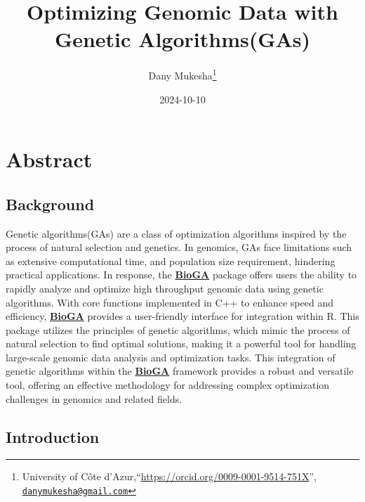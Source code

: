 \documentclass[
]{article}
\title{Optimizing Genomic Data with Genetic Algorithms(GAs)}
\author{Dany Mukesha\footnote{University of Côte
  d'Azur,``\url{https://orcid.org/0009-0001-9514-751X}'',
  \href{mailto:danymukesha@gmail.com}{\nolinkurl{danymukesha@gmail.com}}}}
\date{2024-10-10}
\begin{document}
\maketitle

\fontsize{12}{15}
\selectfont

\section{Abstract}\label{abstract}

\subsection{Background}\label{background}

Genetic algorithms(GAs) are a class of optimization algorithms inspired
by the process of natural selection and genetics. In genomics, GAs face
limitations such as extensive computational time, and population size
requirement, hindering practical applications. In response, the
\href{https://doi.org/doi:10.18129/B9.bioc.BioGA}{\textbf{BioGA}}
package offers users the ability to rapidly analyze and optimize high
throughput genomic data using genetic algorithms. With core functions
implemented in C++ to enhance speed and efficiency,
\href{https://doi.org/doi:10.18129/B9.bioc.BioGA}{\textbf{BioGA}}
provides a user-friendly interface for integration within R. This
package utilizes the principles of genetic algorithms, which mimic the
process of natural selection to find optimal solutions, making it a
powerful tool for handling large-scale genomic data analysis and
optimization tasks. This integration of genetic algorithms within the
\href{https://doi.org/doi:10.18129/B9.bioc.BioGA}{\textbf{BioGA}}
framework provides a robust and versatile tool, offering an effective
methodology for addressing complex optimization challenges in genomics
and related fields.

\subsection{Introduction}\label{introduction}
\end{document}
